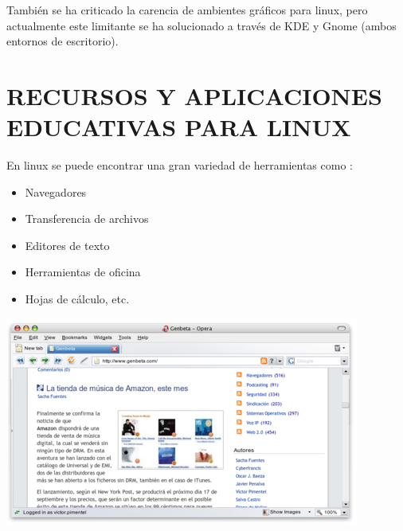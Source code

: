 También se ha criticado la carencia de ambientes gráficos para
linux, pero actualmente este limitante se ha solucionado a través
de KDE y Gnome (ambos entornos de escritorio).

\section*{RECURSOS Y APLICACIONES EDUCATIVAS PARA LINUX}
En linux se puede encontrar una gran variedad de herramientas
como :
\begin{itemize}
  \item Navegadores
  \item Transferencia de archivos
  \item Editores de texto
  \item Herramientas de oficina
  \item Hojas de cálculo, etc.
\end{itemize}
\includegraphics[scale=0.5]{img/cp06/img0602.png}

